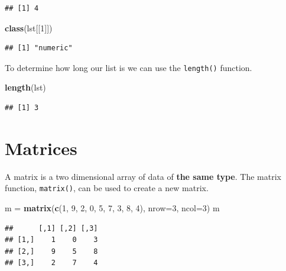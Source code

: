 \documentclass[
]{book}
\newenvironment{Shaded}{\begin{snugshade}}{\end{snugshade}}
\newcommand{\DataTypeTok}[1]{\textcolor[rgb]{0.13,0.29,0.53}{#1}}
\newcommand{\DecValTok}[1]{\textcolor[rgb]{0.00,0.00,0.81}{#1}}
\newcommand{\KeywordTok}[1]{\textcolor[rgb]{0.13,0.29,0.53}{\textbf{#1}}}
\newcommand{\NormalTok}[1]{#1}
\newcommand{\StringTok}[1]{\textcolor[rgb]{0.31,0.60,0.02}{#1}}
\begin{document}
\begin{verbatim}
## [1] 4
\end{verbatim}

\begin{Shaded}
\begin{Highlighting}[]
\KeywordTok{class}\NormalTok{(lst[[}\DecValTok{1}\NormalTok{]])}
\end{Highlighting}
\end{Shaded}

\begin{verbatim}
## [1] "numeric"
\end{verbatim}

To determine how long our list is we can use the \texttt{length()} function.

\begin{Shaded}
\begin{Highlighting}[]
\KeywordTok{length}\NormalTok{(lst)}
\end{Highlighting}
\end{Shaded}

\begin{verbatim}
## [1] 3
\end{verbatim}

\hypertarget{matrices}{%
\section{Matrices}\label{matrices}}

A matrix is a two dimensional array of data of \textbf{the same type}. The matrix function, \texttt{matrix()}, can be used to create a new matrix.

\begin{Shaded}
\begin{Highlighting}[]
\NormalTok{m =}\StringTok{ }\KeywordTok{matrix}\NormalTok{(}\KeywordTok{c}\NormalTok{(}\DecValTok{1}\NormalTok{, }\DecValTok{9}\NormalTok{, }\DecValTok{2}\NormalTok{, }\DecValTok{0}\NormalTok{, }\DecValTok{5}\NormalTok{, }\DecValTok{7}\NormalTok{, }\DecValTok{3}\NormalTok{, }\DecValTok{8}\NormalTok{, }\DecValTok{4}\NormalTok{), }
           \DataTypeTok{nrow=}\DecValTok{3}\NormalTok{, }\DataTypeTok{ncol=}\DecValTok{3}\NormalTok{)}
\NormalTok{m}
\end{Highlighting}
\end{Shaded}

\begin{verbatim}
##      [,1] [,2] [,3]
## [1,]    1    0    3
## [2,]    9    5    8
## [3,]    2    7    4
\end{verbatim}
\end{document}
